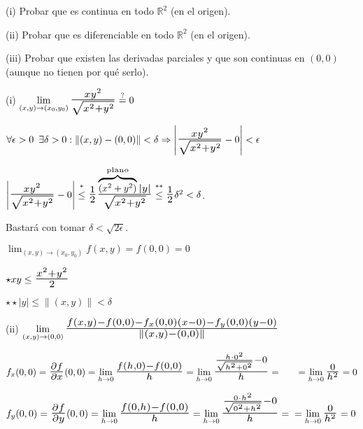 \documentclass[12pt, titlepage]{article}
\newcommand{\eqc}[1]{\stackrel{\mathclap{\normalfont\mbox{\scriptsize{#1}}}}{=}}
\newcommand{\leqc}[1]{\stackrel{\mathclap{\normalfont\mbox{\scriptsize{#1}}}}{\leq}}
\newcommand{\R}{\mathbb{R}}
\newcommand{\bfrac}[2]{\scalebox{1.4}{$\frac{#1}{#2}$}}
\newcommand{\spac}{\, \, \,}
\begin{document}
(i) Probar que es continua en todo $\R^2$ (en el origen).

(ii) Probar que es diferenciable en todo $\R^2$ (en el origen).

(iii) Probar que existen las derivadas parciales y que son continuas en $(0, 0)$ \\ \indent (aunque no tienen 
por qué serlo).
\vspace{3mm}

(i) $\displaystyle \lim_{(x, y) \to (x_0, y_0)} \bfrac{xy^2}{\sqrt{x^2 + y^2}} \eqc{?} 0$

$\forall \epsilon > 0 \spac \exists \delta > 0 : \|(x , y) - (0, 0)\| < \delta \Rightarrow \left | \bfrac{xy^2}{\sqrt
{x^2 + y^2}} - 0 \right | < \epsilon$
\vspace{3mm}

$\left | \bfrac{xy^2}{\sqrt{x^2 + y^2}} - 0 \right | \leqc{*} \bfrac{1}{2} \bfrac{\overbrace{\scalebox{0.7}{$(x^2 + y^2)$}}^{\text{plano}}|y|}{\sqrt{x^2 + y^2}} \leqc{**} \bfrac{1}{2} \delta^2 < \delta$. 
\vspace{3mm}

Bastará con tomar $\delta < \sqrt{2 \epsilon}$.
\vspace{3mm}

$\displaystyle \lim_{(x, y) \to (x_0, y_0)} f (x, y) = f (0, 0) = 0$
\vspace{3mm}

$\star xy \leq \bfrac{x^2 + y^2}{2}$
\vspace{2mm}

$\star \star |y| \leq \|(x, y)\| < \delta$
\vspace{5mm}

(ii) $\displaystyle \lim_{(x, y) \to (0, 0)} \bfrac{f (x, y) - f (0, 0) - f_x (0, 0) (x - 0) - f_y (0, 0) (y - 0)}{\|(x, y) 
- (0, 0)\|}$
\vspace{5mm}

$f_x (0, 0) = \bfrac{\partial f}{\partial x} (0, 0) = \displaystyle \lim_{h \to 0} \bfrac{f (h, 0) - f (0, 0)}{h} = 
\lim_{h \to 0} \bfrac{\frac{h \cdot 0^2}{\sqrt{h^2 + 0^2}} - 0}{h} = \\ \indent = \lim_{h \to 0} \bfrac{0}{h^2} = 0$
\vspace{3mm}

$f_y (0, 0) = \bfrac{\partial f}{\partial y} (0, 0)= \displaystyle \lim_{h \to 0} \bfrac{f (0, h) - f (0, 0)}{h} = 
\lim_{h \to 0} \bfrac{\frac{0 \cdot h^2}{\sqrt{0^2 + h^2}} - 0}{h} = \\ = \lim_{h \to 0}  \bfrac{0}{h^2} = 
0$
\vspace{3mm}
\end{document}
